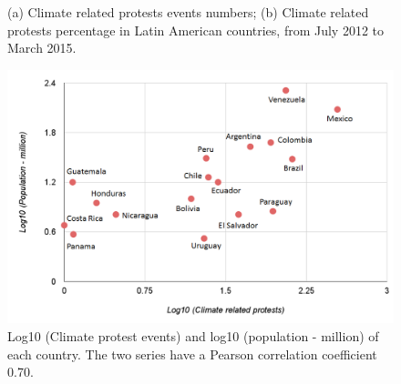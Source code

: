 \begin{figure}[t]
	\centering
	\caption{(a) Climate related protests events numbers; (b) Climate related protests percentage in Latin American countries, from July 2012 to March 2015. }
\label{map}
\end{figure}



\begin{figure}[ht]
\centerline
{\includegraphics[width=.8\textwidth]{figures/protest-population}}
\caption{Log10 (Climate protest events) and log10 (population - million) of each country. The two series have a Pearson correlation coefficient 0.70.}
\label{protest-population}
\end{figure}

